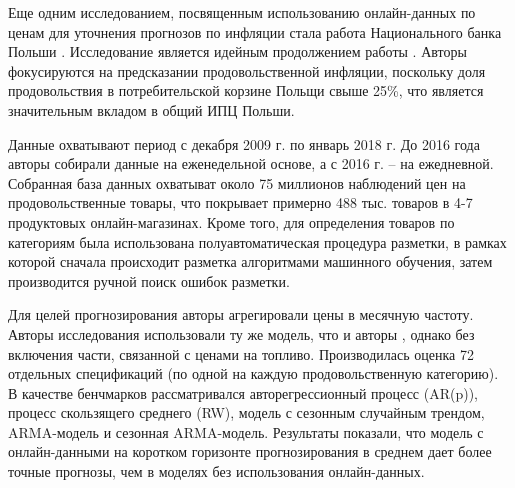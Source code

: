 Еще одним исследованием, посвященным использованию онлайн-данных по ценам для уточнения прогнозов по инфляции стала работа Национального банка Польши \cite{macias2023nowcasting}. Исследование является идейным продолжением работы \cite{aparicio2020forecasting}. Авторы фокусируются на предсказании продовольственной инфляции, поскольку доля продовольствия в потребительской корзине Польщи свыше 25\%, что является значительным вкладом в общий ИПЦ Польши.

Данные охватывают период с декабря 2009 г. по январь 2018 г. До 2016 года авторы собирали данные на еженедельной основе, а с 2016 г. – на ежедневной. Собранная база данных охватыват около 75 миллионов наблюдений цен на продовольственные товары, что покрывает примерно 488 тыс. товаров в 4-7 продуктовых онлайн-магазинах. Кроме того, для определения товаров по категориям была использована полуавтоматическая процедура разметки, в рамках которой сначала происходит разметка алгоритмами машинного обучения, затем производится ручной поиск ошибок разметки.

Для целей прогнозирования авторы агрегировали цены в месячную частоту. Авторы исследования использовали ту же модель, что и авторы \cite{aparicio2020forecasting}, однако без включения части, связанной с ценами на топливо. Производилась оценка 72 отдельных спецификаций (по одной на каждую продовольственную категорию). В качестве бенчмарков рассматривался авторегрессионный процесс (AR(p)), процесс скользящего среднего (RW), модель с сезонным случайным трендом, ARMA-модель и сезонная ARMA-модель. Результаты показали, что модель с онлайн-данными на коротком горизонте прогнозирования в среднем дает более точные прогнозы, чем в моделях без использования онлайн-данных. \cite{macias2023nowcasting}
